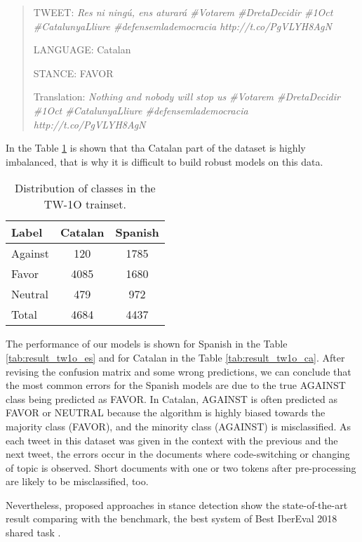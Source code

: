 \documentclass[10pt, a4paper]{article}
\begin{document}
\begin{quote}
TWEET: \textit{Res ni ning\'u, ens aturar\'a \#Votarem \#DretaDecidir \#1Oct \#CatalunyaLliure \#defensemlademocracia http://t.co/PgVLYH8AgN }

LANGUAGE: Catalan

STANCE: FAVOR

Translation: \textit{Nothing and nobody will stop us \#Votarem \#DretaDecidir \#1Oct \#CatalunyaLliure \#defensemlademocracia http://t.co/PgVLYH8AgN}
\end{quote}

In the Table \ref{tab:twdatasetdistr} is shown that tha Catalan part of the dataset is highly imbalanced, that is why it is difficult to build robust models on this data.

\begin{table}[!ht]
\centering
\begin{tabular}{lcc} \hline
      Label & Catalan & Spanish\\ \hline
    Against & 120 & 1785 \\
      Favor & 4085 & 1680 \\
     Neutral & 479 & 972 \\ \hline
      Total & 4684 & 4437 \\ \hline
\end{tabular}
\caption{Distribution of classes in the TW-1O trainset.}\label{tab:twdatasetdistr}
\end{table}

The performance of our models is shown for Spanish in the Table \ref{tab:result_tw1o_es} and for Catalan in the Table \ref{tab:result_tw1o_ca}. After revising the confusion matrix and some wrong predictions, we can conclude that the most common errors for the Spanish models are due to the true AGAINST class being predicted as FAVOR. In Catalan, AGAINST is often predicted as FAVOR or NEUTRAL because the algorithm is highly biased towards the majority class (FAVOR), and the minority class (AGAINST) is misclassified. As each tweet in this dataset was given in the context with the previous and the next tweet, the errors occur in the documents where code-switching or changing of topic is observed. Short documents with one or two tokens after pre-processing are likely to be misclassified, too.

Nevertheless, proposed approaches in stance detection show the state-of-the-art result comparing with the benchmark, the best system of Best IberEval 2018 shared task \cite{Segura-Bedmar18,taule18}.
\end{document}
